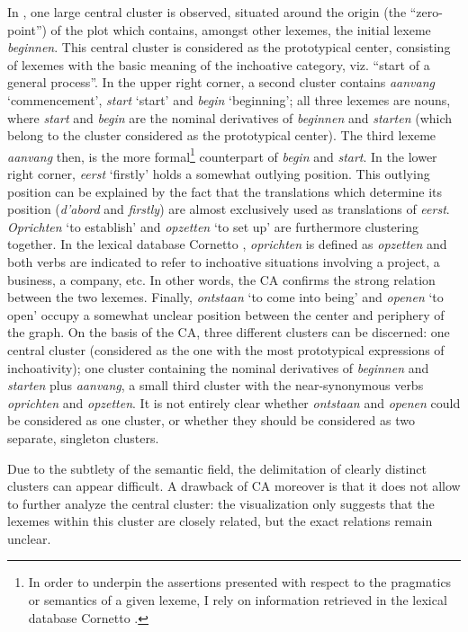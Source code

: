 In , one large central cluster is observed, situated around the origin (the ``zero-point'') of the plot which contains, amongst other lexemes, the initial lexeme \textit{beginnen}. This central cluster is considered as the prototypical center, consisting of lexemes with the basic meaning of the inchoative category, viz. “start of a general process”. In the upper right corner, a second cluster contains \textit{aanvang} `commencement', \textit{start} `start' and \textit{begin} `beginning'; all three lexemes are nouns, where \textit{start} and \textit{begin} are the nominal derivatives of \textit{beginnen} and \textit{starten} (which belong to the cluster considered as the prototypical center). The third lexeme \textit{aanvang} then, is the more formal\footnote{In order to underpin the assertions presented with respect to the pragmatics or semantics of a given lexeme, I rely on information retrieved in the lexical database Cornetto \citep{spyns_cornetto:_2013}.} counterpart of \textit{begin} and \textit{start}. In the lower right corner, \textit{eerst} `firstly' holds a somewhat outlying position. This outlying position can be explained by the fact that the translations which determine its position (\textit{d’abord} and \textit{firstly}) are almost exclusively used as translations of \textit{eerst}. \textit{Oprichten} `to establish' and \textit{opzetten} `to set up' are furthermore clustering together. In the lexical database Cornetto \citep{vossen_cornetto_2008, spyns_cornetto:_2013}, \textit{oprichten} is defined as \textit{opzetten} and both verbs are indicated to refer to inchoative situations involving a project, a business, a company, etc. In other words, the CA confirms the strong relation between the two lexemes. Finally, \textit{ontstaan} `to come into being' and \textit{openen} `to open' occupy a somewhat unclear position between the center and periphery of the graph. On the basis of the CA, three different clusters can be discerned: one central cluster (considered as the one with the most prototypical expressions of inchoativity); one cluster containing the nominal derivatives of \textit{beginnen} and \textit{starten} plus \textit{aanvang}, a small third cluster with the near-synonymous verbs \textit{oprichten} and \textit{opzetten}. It is not entirely clear whether \textit{ontstaan} and \textit{openen} could be considered as one cluster, or whether they should be considered as two separate, singleton clusters.

Due to the subtlety of the semantic field, the delimitation of clearly distinct clusters can appear difficult. A drawback of CA moreover is that it does not allow to further analyze the central cluster: the visualization only suggests that the lexemes within this cluster are closely related, but the exact relations remain unclear.


